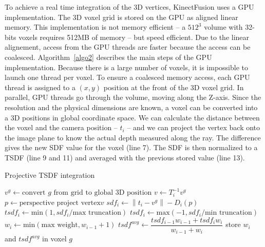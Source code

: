 \documentclass[12pt]{article}
\begin{document}
To achieve a real time integration of the 3D vertices, KinectFusion uses a GPU implementation. The 3D voxel grid is stored on the GPU as aligned linear memory. This implementation is not memory efficient -- a $512^3$ volume with 32-bits voxels requires 512MB of memory -- but speed efficient. Due to the linear alignement, access from the GPU threads are faster because the access can be coalesced. Algorithm~\ref{algo2} describes the main steps of the GPU implementation. Because there is a large number of voxels, it is impossible to launch one thread per voxel. To ensure a coalesced memory access, each GPU thread is assigned to a $(x,y)$ position at the front of the 3D voxel grid. In parallel, GPU threads go through the volume, moving along the Z-axis. Since the resolution and the physical dimensions are known, a voxel can be converted into a 3D positions in global coordinate space. We can calculate the distance between the voxel and the camera position -- $t_i$ -- and we can project the vertex back onto the image plane to know the actual depth measured along the ray. The difference gives the new SDF value for the voxel (line 7). The SDF is then normalized to a TSDF (line 9 and 11) and averaged with the previous stored value (line 13).

\begin{algorithm}
\caption{Projective TSDF integration}\label{algo2}
\begin{algorithmic}[1]
  \State $v^g \gets \text{convert }g\text{ from grid to global 3D position}$
  \State $v \gets T_i^{-1}v^g$
  \State $p \gets \text{perspective project vertex} v$
    \State $sdf_i \gets \left\|t_i-v^{g}\right\| - D_i(p)$
      \State $tsdf_i \gets \text{min}(1, sdf_i/\text{max truncation})$
      \Else
      \State $tsdf_i \gets \text{max}(-1, sdf_i/\text{min truncation})$
      \EndIf
    \State $w_i \gets \text{min}(\text{max weight}, w_{i-1}+1)$
    \State $tsdf^{avg} \gets \dfrac{tsdf_{i-1}w_{i-1}+tsdf_iw_i}{w_{i-1}+w_i}$
    \State store $w_i$ and $tsdf^{avg}$ in voxel $g$
    \EndIf
  \EndWhile
\EndFor
\end{algorithmic}
\end{algorithm}
\end{document}
